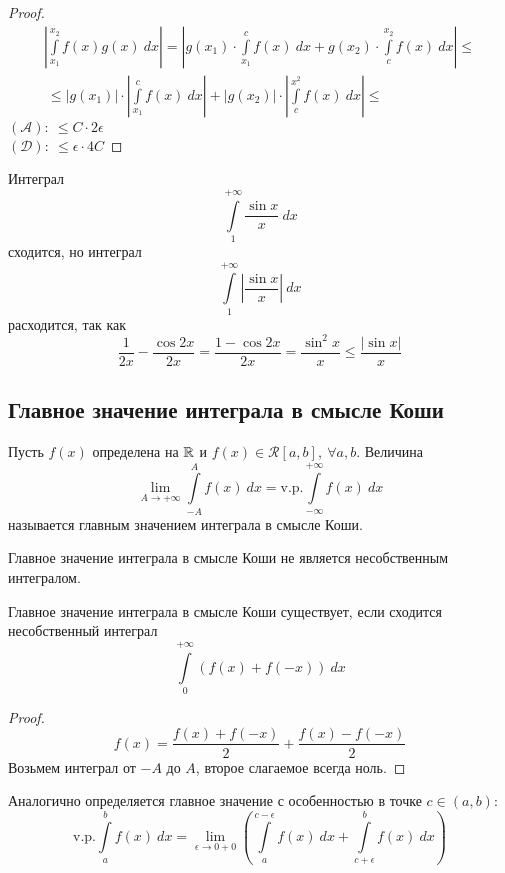\begin{proof}
    \begin{multline*}
        \left|\int\limits_{x_1}^{x_2}f(x)g(x)\ dx\right|=\left|g(x_1)\cdot \int\limits_{x_1}^{c}f(x)\ dx+g(x_2)\cdot \int\limits_{c}^{x_2}f(x)\ dx\right|\leq\\\
        \leq |g(x_1)|\cdot \left|\int\limits_{x_1}^{c}f(x)\ dx\right|+|g(x_2)|\cdot \left|\int\limits_{c}^{x^2}f(x)\ dx\right|\leq
    \end{multline*} 
    $(\mathcal{A}):\ \leq C\cdot 2\epsilon$\\
    $(\mathcal{D}):\ \leq \epsilon \cdot 4C$
\end{proof} 
\begin{example} Интеграл 
    \[\int\limits_{1}^{+\infty}\frac{\sin{x}}{x}\ dx\]
    сходится, но интеграл
    \[\int\limits_{1}^{+\infty}\left|\frac{\sin{x}}{x}\right|\ dx\]
    расходится, так как
    \[\frac{1}{2x}-\frac{\cos{2x}}{2x}=\frac{1-\cos{2x}}{2x}=\frac{\sin^2{x}}{x}\leq \frac{|\sin{x}|}{x}\]
\end{example}
\subsection{Главное значение интеграла в смысле Коши}
\begin{definition}
    Пусть $f(x)$ определена на $\mathbb{R}$ и $f(x)\in \mathcal{R}[a,b],\ \forall a,b$. Величина
    \[\lim\limits_{A\to +\infty}\int\limits_{-A}^{A}f(x)\ dx=\text{v.p.} \int\limits_{-\infty}^{+\infty}f(x)\ dx\]
    называется главным значением интеграла в смысле Коши. %
\end{definition} 
\begin{comm}
    Главное значение интеграла в смысле Коши не является несобственным интегралом.
\end{comm} 
\begin{theorem}
    Главное значение интеграла в смысле Коши существует, если сходится несобственный интеграл
    \[\int\limits_{0}^{+\infty}(f(x)+f(-x))\ dx\]
\end{theorem} 
\begin{proof}
    \[f(x)=\frac{f(x)+f(-x)}{2}+\frac{f(x)-f(-x)}{2}\]
    Возьмем интеграл от $-A$ до $A$, второе слагаемое всегда ноль.
\end{proof} 
\begin{comm}
    Аналогично определяется главное значение с особенностью в точке $c\in (a,b)$:
    \[\text{v.p.}\int\limits_{a}^{b}f(x)\ dx=\lim\limits_{\epsilon\to 0+0}\left(\int\limits_{a}^{c-\epsilon}f(x)\ dx+\int\limits_{c+\epsilon}^{b}f(x)\ dx\right)\]
\end{comm} 